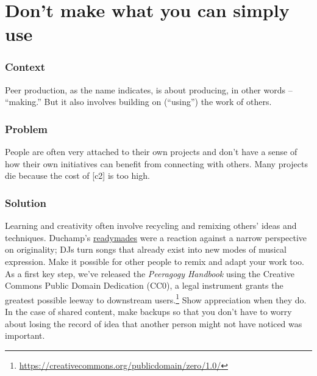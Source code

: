 \begingroup \color{BurntOrange}

\section{Don't make what you can simply use} \label{sec:Use_or_make}

\subsubsection*{Context}
Peer production, as the name indicates, is about producing, in other words -- ``making.'' But it also involves building on (``using'') the work of others.

\subsubsection*{Problem}
People are often very attached to their own projects and don't have a sense of how their own initiatives can benefit from connecting with others. Many projects die because the cost of  [c2] is too high.

\subsubsection*{Solution} Learning and creativity often involve recycling and remixing others' ideas and techniques.   Duchamp's {\href{https://en.wikipedia.org/w/index.php?title=Readymades_of_Marcel_Duchamp&oldid=660437742}{readymades}} were a reaction against a narrow perspective on originality; DJs turn songs that already exist into new modes of musical expression.  Make it possible for other people to remix and adapt your work too.  As a first key step, we've released the \emph{Peeragogy Handbook} using the Creative Commons Public Domain Dedication (CC0), a legal instrument grants the greatest possible leeway to downstream users.\footnote{\url{https://creativecommons.org/publicdomain/zero/1.0/}}  Show appreciation when they do.  In the case of shared content, make backups so that you don't have to worry about losing the record of idea that another person might not have noticed was important.

